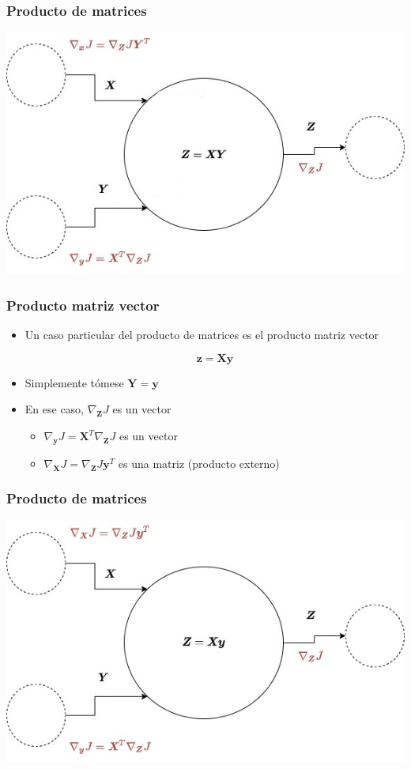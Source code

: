 \documentclass{beamer}
\begin{document}
\begin{frame}
\frametitle{Producto de matrices}
\includegraphics[scale=0.35]{im29}
\end{frame}
\begin{frame}
\frametitle{Producto matriz vector}
\begin{itemize}
\item Un caso particular del producto de matrices es el producto matriz vector

\begin{equation*}
 \boldsymbol{z}=\boldsymbol{X}\boldsymbol{y}
\end{equation*}
\item Simplemente tómese $\boldsymbol{Y}=\boldsymbol{y}$
\item En ese caso, $\nabla_{\boldsymbol{Z}}J$ es un vector
\begin{itemize}
\item $\nabla_{\boldsymbol{y}}J=\boldsymbol{X}^T \nabla_{\boldsymbol{Z}}J $ es un vector
\item $\nabla_{\boldsymbol{X}}J=\nabla_{\boldsymbol{Z}}J \boldsymbol{y}^T  $ es una matriz (producto externo)
\end{itemize}

\end{itemize}
\end{frame}
\begin{frame}
\frametitle{Producto de matrices}
\includegraphics[scale=0.35]{im30} 
\end{frame}
\ThankYouFrame
\end{document}
